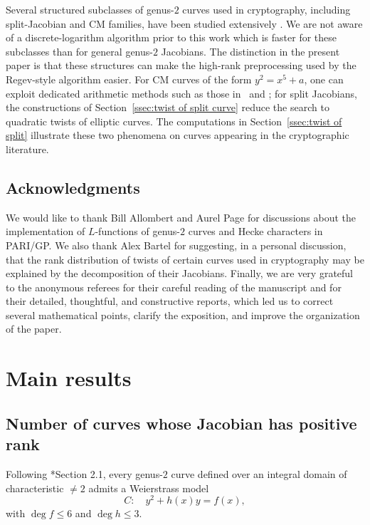 \documentclass{amsart}
\begin{document}
Several structured subclasses of genus-$2$ curves used in cryptography, including
split-Jacobian and CM families, have been studied extensively
\cites{Buhler1998,Brown2005,Drylo2012,Kawazoe2008}. We are not aware of a
discrete-logarithm algorithm prior to this work which is faster for these
subclasses than for general genus-$2$ Jacobians. The distinction in the present
paper is that these structures can make the high-rank preprocessing used by the
Regev-style algorithm easier. For CM curves of the form $y^2=x^5+a$, one can
exploit dedicated arithmetic methods such as those in~\cite{Stoll2002} and
\cite{Molin2022}; for split Jacobians, the constructions of
Section~\ref{ssec:twist of split curve} reduce the search to quadratic twists of
elliptic curves. The computations in Section~\ref{ssec:twist of split} illustrate
these two phenomena on curves appearing in the cryptographic literature.

\subsection*{Acknowledgments} We would like to thank Bill Allombert and Aurel Page for discussions about the implementation of \(L\)-functions of genus-\(2\) curves and Hecke characters in PARI/GP. We also thank Alex Bartel for suggesting, in a personal discussion, that the rank distribution of twists of certain curves used in cryptography may be explained by the decomposition of their Jacobians. Finally, we are very grateful to the anonymous referees for their careful reading of the manuscript and for their detailed, thoughtful, and constructive reports, which led us to correct several mathematical points, clarify the exposition, and improve the organization of the paper.



\section{Main results}

\subsection{Number of curves whose Jacobian has positive rank}

\label{ssec:torsion}


Following \cite{Booker2016}*{Section 2.1}, every genus-$2$ curve defined over an integral domain of characteristic
$\neq 2$ admits a Weierstrass model
\begin{equation}\label{eq:booker-weierstrass}
  C:\quad y^2+h(x)y=f(x),
\end{equation}
with $\deg f\le 6$ and $\deg h\le 3$. 
\end{document}
